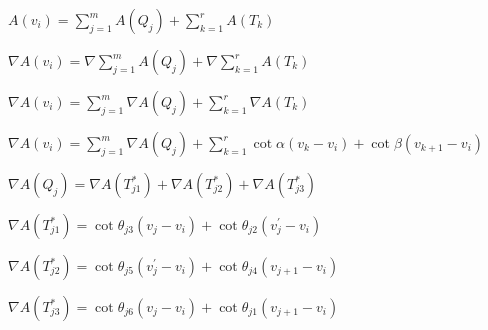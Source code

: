 \documentclass{article}
\begin{document}
$A\left( v_{i}\right) =\sum_{j=1}^{m}A(Q_{j})+\sum_{k=1}^{r}A(T_{k})$

$\nabla A\left( v_{i}\right) =\nabla \sum_{j=1}^{m}A(Q_{j})+\nabla
\sum_{k=1}^{r}A(T_{k})$

$\nabla A\left( v_{i}\right) =\sum_{j=1}^{m}\nabla
A(Q_{j})+\sum_{k=1}^{r}\nabla A(T_{k})$

$\nabla A\left( v_{i}\right) =\sum_{j=1}^{m}\nabla
A(Q_{j})+\sum_{k=1}^{r}\cot \alpha \left( v_{k}-v_{i}\right) +\cot \beta
\left( v_{k+1}-v_{i}\right) $

$\nabla A(Q_{j})=\nabla A\left( T_{j1}^{\ast }\right) +\nabla A\left(
T_{j2}^{\ast }\right) +\nabla A\left( T_{j3}^{\ast }\right) $

$\nabla A\left( T_{j1}^{\ast }\right) =\cot \theta _{j3}\left(
v_{j}-v_{i}\right) +\cot \theta _{j2}\left( v_{j}^{\prime }-v_{i}\right) $

$\nabla A\left( T_{j2}^{\ast }\right) =\cot \theta _{j5}\left( v_{j}^{\prime
}-v_{i}\right) +\cot \theta _{j4}\left( v_{j+1}-v_{i}\right) $

$\nabla A\left( T_{j3}^{\ast }\right) =\cot \theta _{j6}\left(
v_{j}-v_{i}\right) +\cot \theta _{j1}\left( v_{j+1}-v_{i}\right) $
\end{document}
